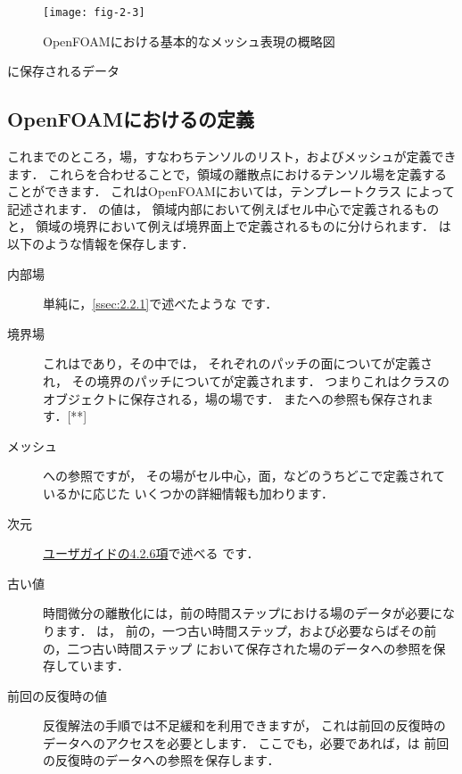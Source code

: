 \begin{figure}[ht]
 \texttt{[image: fig-2-3]}
 \caption{OpenFOAMにおける基本的なメッシュ表現の概略図}
 \label{fig:2.3}
\end{figure}


\begin{table}[ht]
 
 \caption{に保存されるデータ}
 \label{tbl:2.1}
\end{table}


\subsection{OpenFOAMにおけるの定義}
\label{ssec:2.3.2}
これまでのところ，場，すなわちテンソルのリスト，およびメッシュが定義できます．
これらを合わせることで，領域の離散点におけるテンソル場を定義することができます．
これはOpenFOAMにおいては，テンプレートクラス
によって記述されます．
の値は，
領域内部において例えばセル中心で定義されるものと，
領域の境界において例えば境界面上で定義されるものに分けられます．
は以下のような情報を保存します．
\begin{description}
 \item[内部場] 単純に，\autoref{ssec:2.2.1}で述べたような
            です．
 \item[境界場] これはであり，その中では，
            それぞれのパッチの面についてが定義され，
            その境界のパッチについてが定義されます．
            つまりこれはクラスのオブジェクトに保存される，場の場です．
            またへの参照も保存されます．[**]
 \item[メッシュ] への参照ですが，
            その場がセル中心，面，などのうちどこで定義されているかに応じた
            いくつかの詳細情報も加わります．
 \item[次元] \href{UserGuideJa.pdf#subsection.4.2.6}{ユーザガイドの4.2.6項}で述べる
            です．
 \item[古い値] 時間微分の離散化には，前の時間ステップにおける場のデータが必要になります．
            は，
            前の，一つ古い時間ステップ，および必要ならばその前の，二つ古い時間ステップ
            において保存された場のデータへの参照を保存しています．
 \item[前回の反復時の値] 反復解法の手順では不足緩和を利用できますが，
            これは前回の反復時のデータへのアクセスを必要とします．
            ここでも，必要であれば，は
            前回の反復時のデータへの参照を保存します．
\end{description}
